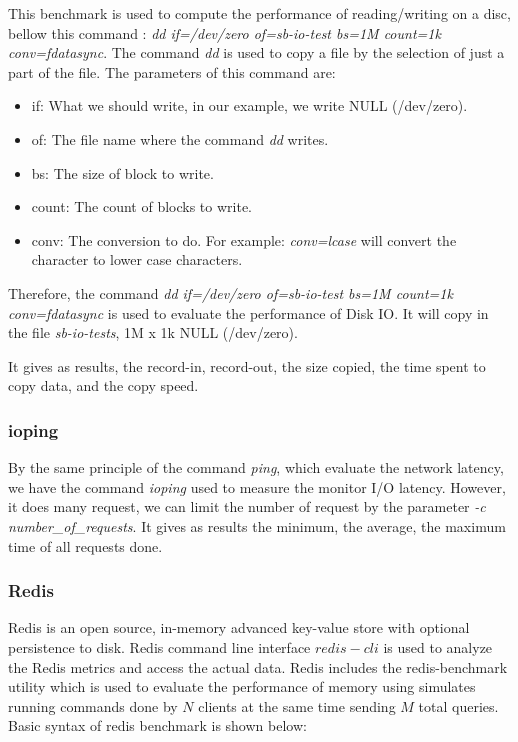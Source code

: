 \documentclass[10pt, conference]{IEEEtran}
\begin{document}
This benchmark is used to compute the performance of reading/writing on a disc, bellow this command : \textit{dd if=/dev/zero of=sb-io-test bs=1M count=1k conv=fdatasync}. The command \textit{dd} is used to copy a file by the selection of just a part of the file. The parameters of this command are:

\begin{itemize}

\item if: What we should write, in our example, we write NULL (/dev/zero).
\item of: The file name where the command \textit{dd} writes.
\item bs: The size of block to write.
\item count: The count of blocks to write. 
\item conv: The conversion to do. For example: \textit{conv=lcase} will convert the character to lower case characters.

\end{itemize}

Therefore, the command \textit{dd if=/dev/zero of=sb-io-test bs=1M count=1k conv=fdatasync} is used to evaluate the performance of Disk IO. It will copy in the file \textit{sb-io-tests}, 1M x 1k NULL (/dev/zero).

It gives as results, the record-in, record-out, the size copied, the time spent to copy data, and the copy speed.

\subsubsection{ioping}

By the same principle of the command \textit{ping}, which evaluate the network latency, we have the command \textit{ioping} used to measure the monitor I/O latency. However, it does many request, we can limit the number of request by the parameter \textit{-c number\_of\_requests}. It gives as results the minimum, the average, the maximum time of all requests done.

\subsubsection{Redis}

\indent Redis is an open source, in-memory advanced key-value store with optional persistence to disk. Redis command line interface ${redis-cli}$ is used to analyze the Redis metrics and access the actual data. Redis includes the redis-benchmark utility which is used to evaluate the performance of memory using simulates running commands done by $N$ clients at the same time sending $M$ total queries. Basic syntax of redis benchmark is shown below:\\
\end{document}
